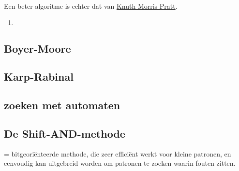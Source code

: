 \documentclass{report}
\begin{document}
Een beter algoritme is echter dat van \underline{Knuth-Morris-Pratt}.
\begin{enumerate}
	\item 
\end{enumerate}



\subsection{Boyer-Moore}

\subsection{Karp-Rabinal}

\subsection{zoeken met automaten}

\subsection{De Shift-AND-methode}
= bitgeoriënteerde methode, die zeer efficiënt werkt voor kleine patronen, en eenvoudig kan uitgebreid worden om patronen te zoeken waarin fouten zitten.
\end{document}
